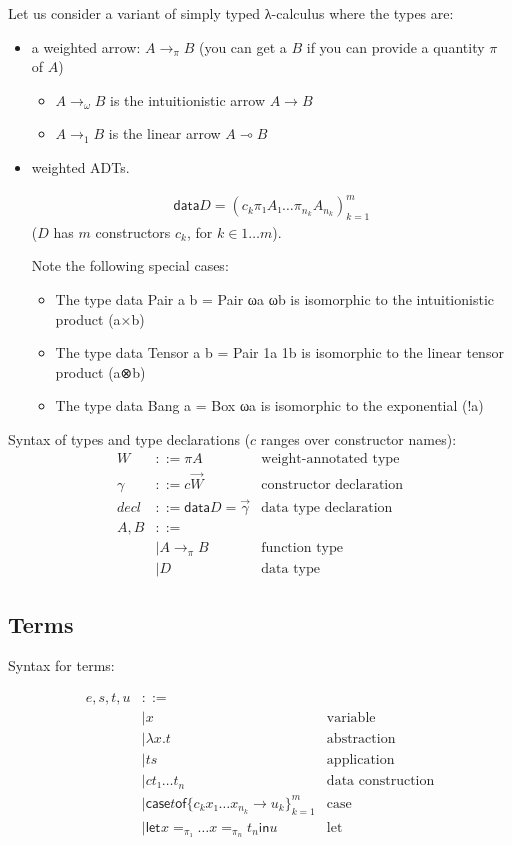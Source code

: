 \documentclass[11pt]{article}
\newcommand{\case}[2]{\mathsf{case} #1 \mathsf{of} \{#2\}^m_{k=1}}
\newcommand{\flet}[1][]{\mathsf{let}_{#1} }
\newcommand{\fin}{ \mathsf{in} }
\begin{document}
Let us consider a variant of simply typed λ-calculus where the types
are:

\begin{itemize}
\item a weighted arrow: \(A →_π B\) (you can get a \(B\) if you can provide a
quantity \(π\) of \(A\))
\begin{itemize}
\item \(A →_ω B\) is the intuitionistic arrow \(A → B\)
\item \(A →_1 B\) is the linear arrow \(A ⊸ B\)
\end{itemize}
\item weighted ADTs.

\begin{align*}
\mathsf{data} D = (c_k  π₁ A₁  …  π_{n_k} A_{n_k})^m_{k=1}
\end{align*}
(\(D\) has \(m\) constructors \(c_k\), for \(k ∈ 1…m\)).

Note the following special cases:
\begin{itemize}
\item The type data Pair a b = Pair ωa ωb is isomorphic to the intuitionistic product (a×b)
\item The type data Tensor a b = Pair 1a 1b is isomorphic to the linear tensor product (a⊗b)
\item The type data Bang a = Box ωa is isomorphic to the exponential (!a)
\end{itemize}
\end{itemize}

Syntax of types and type declarations ($c$ ranges over constructor names):
\begin{align*}
  W &::= πA &\text{weight-annotated type}\\
  γ &::= c  \vec{W}&\text{constructor declaration}\\
  decl &::= \mathsf{data } D = \vec{γ}&\text{data type declaration}\\
  A,B &::=\\
      & |  A →_π B &\text{function type}\\
      & |  D &\text{data type}
\end{align*}

\subsection{Terms}
\label{sec:orgheadline3}

Syntax for terms:

\begin{align*}
e,s,t,u & ::= \\
    & |  x & \text{variable} \\
    & |  λx. t & \text{abstraction} \\
    & |  t s & \text{application} \\
    & |  c t₁ … t_n & \text{data construction} \\
    & |  \case t {c_k  x₁ … x_{n_k} → u_k}  & \text{case} \\
    & |  \flet x =_{π₁} … x =_{π_n} t_n \fin u & \text{let}
\end{align*}
\end{document}
